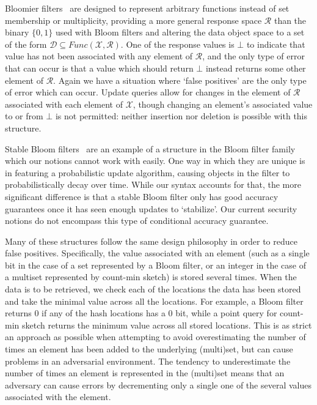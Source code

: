 Bloomier filters~\cite{xxx} are designed to represent arbitrary functions instead of set membership or multiplicity, providing a more general response space $\mathcal{R}$ than the binary $\{0,1\}$ used with Bloom filters and altering the data object space to a set of the form $\mathcal{D} \subseteq Func(\mathcal{X},\mathcal{R})$. One of the response values is $\bot$ to indicate that value has not been associated with any element of $\mathcal{R}$, and the only type of error that can occur is that a value which should return $\bot$ instead returns some other element of $\mathcal{R}$. Again we have a situation where `false positives' are the only type of error which can occur. Update queries allow for changes in the element of $\mathcal{R}$ associated with each element of $\mathcal{X}$, though changing an element's associated value to or from $\bot$ is not permitted: neither insertion nor deletion is possible with this structure.

Stable Bloom filters~\cite{xxx} are an example of a structure in the Bloom filter family which our notions cannot work with easily. One way in which they are unique is in featuring a probabilistic update algorithm, causing objects in the filter to probabilistically decay over time. While our syntax accounts for that, the more significant difference is that a stable Bloom filter only has good accuracy guarantees once it has seen enough updates to `stabilize'. Our current security notions do not encompass this type of conditional accuracy guarantee.

Many of these structures follow the same design philosophy in order to reduce false positives. Specifically, the value associated with an element (such as a single bit in the case of a set represented by a Bloom filter, or an integer in the case of a multiset represented by count-min sketch) is stored several times. When the data is to be retrieved, we check each of the locations the data has been stored and take the minimal value across all the locations. For example, a Bloom filter returns 0 if any of the hash locations has a 0 bit, while a point query for count-min sketch returns the minimum value across all stored locations. This is as strict an approach as possible when attempting to avoid overestimating the number of times an element has been added to the underlying (multi)set, but can cause problems in an adversarial environment. The tendency to underestimate the number of times an element is represented in the (multi)set means that an adversary can cause errors by decrementing only a single one of the several values associated with the element.

